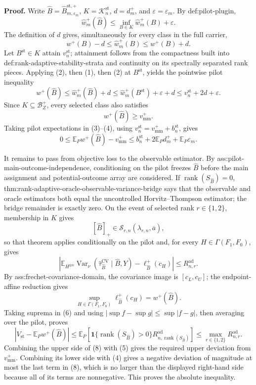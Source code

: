 \textbf{Proof.}
Write \(\widehat B=\widehat B_{m,\varepsilon_m}^{\mathrm{st},+}\), \(K=\mathcal K_n^{\mathrm{st}}\), \(d=d_m^+\), and \(\varepsilon=\varepsilon_m\).  By def:pilot-plugin,
\[
\widehat w_m^+(\widehat B)
\le\inf_{B\in K}\widehat w_m^+(B)+\varepsilon.
\tag{1}
\]
The definition of \(d\) gives, simultaneously for every class in the full carrier,
\[
w^+(B)-d\le\widehat w_m^+(B)\le w^+(B)+d.
\tag{2}
\]
Let \(B^{\mathrm{st}}\in K\) attain \(v_n^{\mathrm{st}}\); attainment follows from the compactness built into def:rank-adaptive-stability-strata and continuity on its spectrally separated rank pieces.  Applying (2), then (1), then (2) at \(B^{\mathrm{st}}\), yields the pointwise pilot inequality
\[
w^+(\widehat B)
\le\widehat w_m^+(\widehat B)+d
\le\widehat w_m^+(B^{\mathrm{st}})+\varepsilon+d
\le v_n^{\mathrm{st}}+2d+\varepsilon.
\tag{3}
\]
Since \(K\subseteq\mathcal B_Z^+\), every selected class also satisfies
\[
w^+(\widehat B)\ge v_{\mathrm{mm}}^+.
\tag{4}
\]
Taking pilot expectations in (3)--(4), using \(v_n^{\mathrm{st}}=v_{\mathrm{mm}}^++b_n^{\mathrm{st}}\), gives
\[
0\le\mathbb E_Pw^+(\widehat B)-v_{\mathrm{mm}}^+
\le b_n^{\mathrm{st}}+2\mathbb E_Pd_m^++\mathbb E_P\varepsilon_m.
\tag{5}
\]

It remains to pass from objective loss to the observable estimator.  By ass:pilot-main-outcome-independence, conditioning on the pilot freezes \(\widehat B\) before the main assignment and potential-outcome array are considered.  If \(\operatorname{rank}(S_{\widehat B})=0\), thm:rank-adaptive-oracle-observable-variance-bridge says that the observable and oracle estimators both equal the uncontrolled Horvitz--Thompson estimator; the bridge remainder is exactly zero.  On the event of selected rank \(r\in\{1,2\}\), membership in \(K\) gives
\[
[\widehat B]_+\in\mathcal S_{r,n}(\lambda_{r,n},\overline a),
\]
so that theorem applies conditionally on the pilot and, for every \(H\in\Gamma(F_1,F_0)\), gives
\[
\left|
\mathbb E_{H^{\otimes n}}
\operatorname{Var}_\nu(\widehat\tau_{\widehat B}^{\mathrm{CV}}\mid\widehat B,Y)
-\ell_{\widehat B}^+(c_H)
\right|
\le R_{n,r}^{\mathrm{ad}}.
\tag{6}
\]
By ass:frechet-covariance-domain, the covariance image is \([c_L,c_U]\); the endpoint-affine reduction gives
\[
\sup_{H\in\Gamma(F_1,F_0)}\ell_{\widehat B}^+(c_H)=w^+(\widehat B).
\tag{7}
\]
Taking suprema in (6) and using \(|\sup f-\sup g|\le\sup|f-g|\), then averaging over the pilot, proves
\[
\left|V_{\mathrm{st}}-\mathbb E_Pw^+(\widehat B)\right|
\le\mathbb E_P\!\left[
\mathbf1\{\operatorname{rank}(S_{\widehat B})>0\}
R_{n,\operatorname{rank}(S_{\widehat B})}^{\mathrm{ad}}
\right]
\le\max_{r\in\{1,2\}}R_{n,r}^{\mathrm{ad}}.
\tag{8}
\]
Combining the upper side of (8) with (5) gives the required upper deviation from \(v_{\mathrm{mm}}^+\).  Combining its lower side with (4) gives a negative deviation of magnitude at most the last term in (8), which is no larger than the displayed right-hand side because all of its terms are nonnegative.  This proves the absolute inequality.

